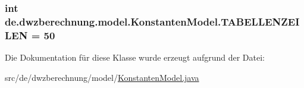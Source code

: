 \subsubsection[{\texorpdfstring{T\+A\+B\+E\+L\+L\+E\+N\+Z\+E\+I\+L\+EN}{TABELLENZEILEN}}]{\setlength{\rightskip}{0pt plus 5cm}int de.\+dwzberechnung.\+model.\+Konstanten\+Model.\+T\+A\+B\+E\+L\+L\+E\+N\+Z\+E\+I\+L\+EN = 50\hspace{0.3cm}{\ttfamily [static]}}\hypertarget{classde_1_1dwzberechnung_1_1model_1_1_konstanten_model_a6364795a819323a058fbce805edb1a95}{}\label{classde_1_1dwzberechnung_1_1model_1_1_konstanten_model_a6364795a819323a058fbce805edb1a95}


Die Dokumentation für diese Klasse wurde erzeugt aufgrund der Datei\+:\begin{DoxyCompactItemize}
\item 
src/de/dwzberechnung/model/\hyperlink{_konstanten_model_8java}{Konstanten\+Model.\+java}\end{DoxyCompactItemize}
